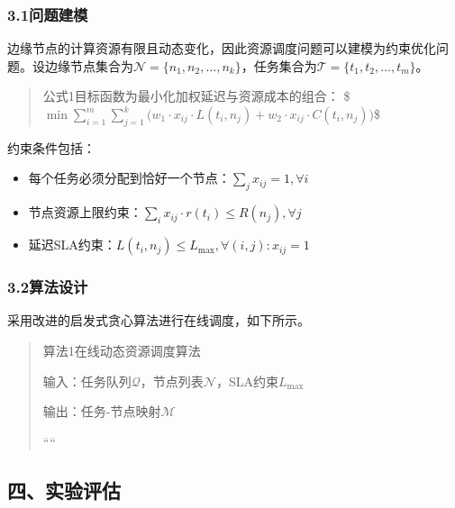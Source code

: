 \documentclass[twocolumn]{harryopo-paper}
\begin{document}
\subsubsection*{3.1问题建模}

边缘节点的计算资源有限且动态变化，因此资源调度问题可以建模为约束优化问题。设边缘节点集合为$\mathcal{N} = \{n_1, n_2, \dots, n_k\}$，任务集合为$\mathcal{T} = \{t_1, t_2, \dots, t_m\}$。

\begin{quote}
{\fzht 公式1}目标函数为最小化加权延迟与资源成本的组合：
\$$\min \sum_{i=1}^{m} \sum_{j=1}^{k} \bigl(w_1 \cdot x_{ij} \cdot L(t_i, n_j) + w_2 \cdot x_{ij} \cdot C(t_i, n_j)\bigr)$\$
\end{quote}

约束条件包括：

\begin{itemize}
  \item 每个任务必须分配到恰好一个节点：$\sum_{j} x_{ij} = 1, \forall i$
  \item 节点资源上限约束：$\sum_{i} x_{ij} \cdot r(t_i) \leq R(n_j), \forall j$
  \item 延迟SLA约束：$L(t_i, n_j) \leq L_{\max}, \forall (i,j): x_{ij}=1$
\end{itemize}

\subsubsection*{3.2算法设计}

采用改进的启发式贪心算法进行在线调度，如下所示。

\begin{quote}
{\fzht 算法1}在线动态资源调度算法

{\fzht 输入}：任务队列$\mathcal{Q}$，节点列表$\mathcal{N}$，SLA约束$L_{\max}$

{\fzht 输出}：任务-节点映射$\mathcal{M}$

````
\end{quote}

\subsection*{四、实验评估}
\end{document}
